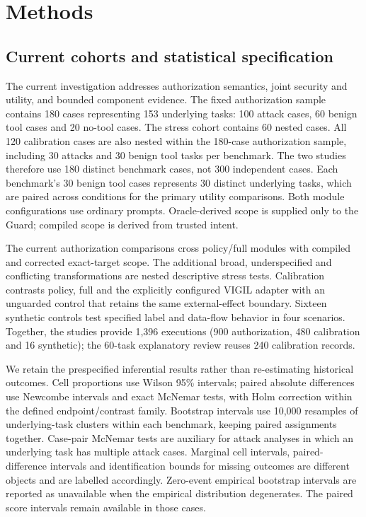 \section{Methods}

\label{sec:methods}

\subsection{Current cohorts and statistical specification}

\label{sec:methods-current-cohorts-and-statistical-specification}

The current investigation addresses authorization semantics, joint security and utility, and bounded component evidence. The fixed authorization sample contains 180 cases representing 153 underlying tasks: 100 attack cases, 60 benign tool cases and 20 no-tool cases. The stress cohort contains 60 nested cases. All 120 calibration cases are also nested within the 180-case authorization sample, including 30 attacks and 30 benign tool tasks per benchmark. The two studies therefore use 180 distinct benchmark cases, not 300 independent cases. Each benchmark's 30 benign tool cases represents 30 distinct underlying tasks, which are paired across conditions for the primary utility comparisons. Both module configurations use ordinary prompts. Oracle-derived scope is supplied only to the Guard; compiled scope is derived from trusted intent.

The current authorization comparisons cross policy/full modules with compiled and corrected exact-target scope. The additional broad, underspecified and conflicting transformations are nested descriptive stress tests. Calibration contrasts policy, full and the explicitly configured VIGIL adapter with an unguarded control that retains the same external-effect boundary. Sixteen synthetic controls test specified label and data-flow behavior in four scenarios. Together, the studies provide 1,396 executions (900 authorization, 480 calibration and 16 synthetic); the 60-task explanatory review reuses 240 calibration records.

We retain the prespecified inferential results rather than re-estimating historical outcomes. Cell proportions use Wilson 95\% intervals; paired absolute differences use Newcombe intervals and exact McNemar tests, with Holm correction within the defined endpoint/contrast family. Bootstrap intervals use 10,000 resamples of underlying-task clusters within each benchmark, keeping paired assignments together. Case-pair McNemar tests are auxiliary for attack analyses in which an underlying task has multiple attack cases. Marginal cell intervals, paired-difference intervals and identification bounds for missing outcomes are different objects and are labelled accordingly. Zero-event empirical bootstrap intervals are reported as unavailable when the empirical distribution degenerates. The paired score intervals remain available in those cases.

